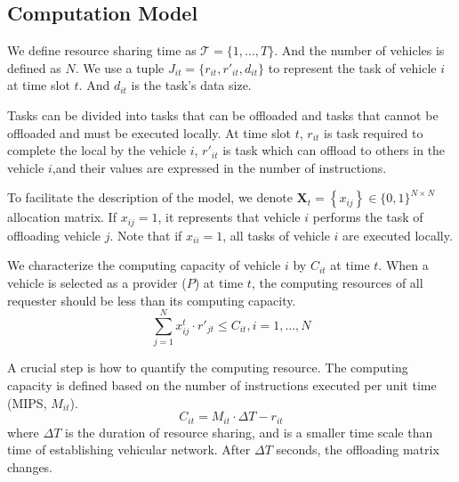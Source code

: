 \documentclass[conference]{IEEEtran}
\begin{document}
	\subsection{Computation Model}
	We define resource sharing time as $ \mathcal{T}=\{1, \ldots, T \}$. 
	And the number of vehicles is defined as $N$. 
	We use a tuple $J_{it} = \{r_ {it}, r'_ {it}, d_{it}\}$ to represent the task of vehicle $i$ at time slot $t$. And $d_{it}$ is the task's data size. 
	
	Tasks can be divided into tasks that can be offloaded and tasks that cannot be offloaded and must be executed locally. 
	At time slot $t$, 
	$r_ {it}$ is task required to complete the local by the vehicle $i$, 
	$r'_ {it}$ is task which can offload to others in the vehicle $i$,and their values are expressed in the number of instructions. 
	
	To facilitate the description of the model, we denote $\mathbf{X}_{t}=\left\{x_{i j}\right\} \in\{0,1\}^{N \times N}$ allocation matrix. If $x_{ij}=1$, it represents that vehicle $i$ performs the task of offloading vehicle $j$. Note that if $x_{ii}=1$, all tasks of vehicle $i$ are executed locally. 
	
	We characterize the computing capacity of vehicle $i$ by $C_ {it}$ at time $t$. When a vehicle is selected as a provider ($P$) at time $t$, the computing resources of all requester should be less than its computing capacity. 
	\begin{equation}
		\sum    \limits_{ j= 1} ^{N}
		{ x_{ij}^{t} \cdot  r'_{jt}} \le C_{it}, i = 1, \dots, N
	\end{equation}
	
	A crucial step is how to quantify the computing resource. 
	The computing capacity is defined based on the number of instructions executed per unit time (MIPS, $M_{it}$). 
	\begin{equation}
		C_{it} = M_{it}   \cdot \Delta T 
		- r_{it}
		\label{cm}
	\end{equation}
	where $\Delta T$ is the duration of resource sharing, and is a smaller time scale than time of establishing vehicular network. After $\Delta T$ seconds, the offloading matrix changes. 
	
\end{document}

